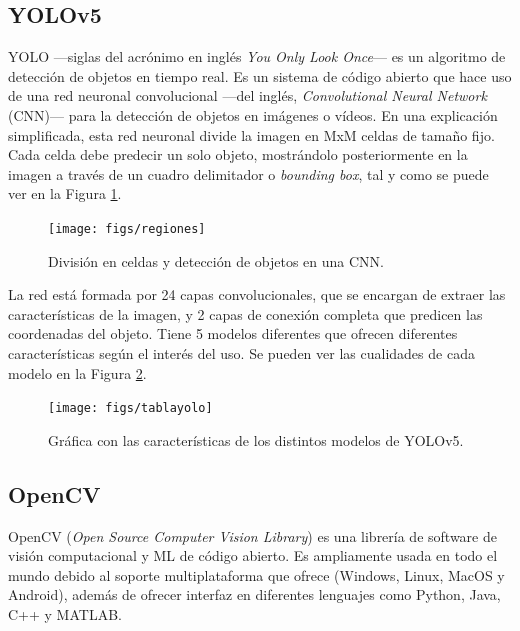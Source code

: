 \subsection{YOLOv5}
\label{sec:yolo}
YOLO ---siglas del acrónimo en inglés \textit{You Only Look Once}--- es un algoritmo de detección de objetos en tiempo real. Es un sistema de código abierto que hace uso de una red neuronal convolucional ---del inglés, \textit{Convolutional Neural Network} (CNN)--- para la detección de objetos en imágenes o vídeos. En una explicación simplificada, esta red neuronal divide la imagen en MxM celdas de tamaño fijo. Cada celda debe predecir un solo objeto, mostrándolo posteriormente en la imagen a través de un cuadro delimitador o \textit{bounding box}, tal y como se puede ver en la Figura \ref{fig:regiones}.\\
\begin{figure} [h!]
  \begin{center}
    \texttt{[image: figs/regiones]}
  \end{center}
  \caption{División en celdas y detección de objetos en una CNN.}
  \label{fig:regiones}
\end{figure}

La red está formada por 24 capas convolucionales, que se encargan de extraer las características de la imagen, y 2 capas de conexión completa que predicen las coordenadas del objeto. Tiene 5 modelos diferentes que ofrecen diferentes características según el interés del uso. Se pueden ver las cualidades de cada modelo en la Figura \ref{fig:tablayolo}. \\
\begin{figure} [h!]
  \begin{center}
    \texttt{[image: figs/tablayolo]}
  \end{center}
  \caption[]{Gráfica con las características de los distintos modelos de YOLOv5\footnotemark.} \label{fig:tablayolo}
\end{figure}

\subsection{OpenCV}
\label{sec:opencv}
OpenCV (\textit{Open Source Computer Vision Library}) es una librería de software de visión computacional y ML de código abierto. Es ampliamente usada en todo el mundo debido al soporte multiplataforma que ofrece (Windows, Linux, MacOS y Android), además de ofrecer interfaz en diferentes lenguajes como Python, Java, C++ y MATLAB.\\

